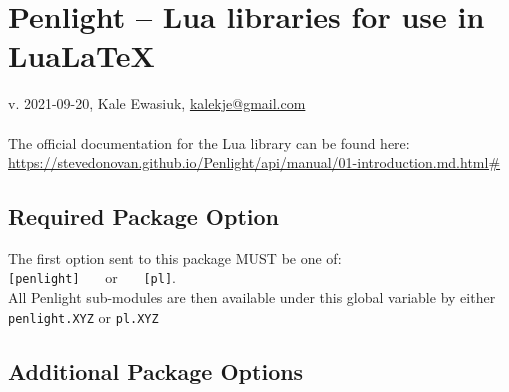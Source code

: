 \documentclass{article}
\begin{document}
    \section*{Penlight -- Lua libraries for use in LuaLaTeX}
    v. 2021-09-20, Kale Ewasiuk, \url{kalekje@gmail.com}\\\\

        The official documentation for the Lua library can be found here:\\
  \mbox{\url{https://stevedonovan.github.io/Penlight/api/manual/01-introduction.md.html#}}
    \\

    \subsection*{Required Package Option}
    The first option sent to this package MUST be one of: \\
    \texttt{[penlight]} \ \ \  or \ \ \  \texttt{[pl]}.\\
    All Penlight sub-modules are then available under this global variable by either\\
    \texttt{penlight.XYZ} or \texttt{pl.XYZ}



    \subsection*{Additional Package Options}
\end{document}
